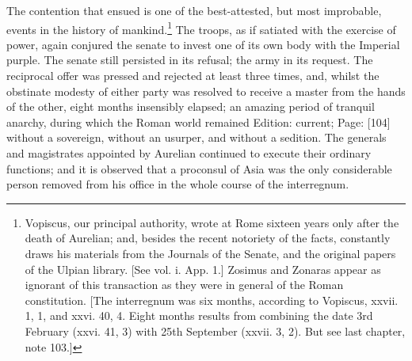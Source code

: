 The contention that ensued is one of the best-attested, but most improbable, events in the history of mankind.\footnote{Vopiscus, our principal authority, wrote at Rome sixteen years only after the death of Aurelian; and, besides the recent notoriety of the facts, constantly draws his materials from the Journals of the Senate, and the original papers of the Ulpian library. [See vol. i. App. 1.] Zosimus and Zonaras appear as ignorant of this transaction as they were in general of the Roman constitution. [The interregnum was six months, according to Vopiscus, xxvii. 1, 1, and xxvi. 40, 4. Eight months results from combining the date 3rd February (xxvi. 41, 3) with 25th September (xxvii. 3, 2). But see last chapter, note 103.]} The troops, as if satiated with the exercise of power, again conjured the senate to invest one of its own body with the Imperial purple. The senate still persisted in its refusal; the army in its request. The reciprocal offer was pressed and rejected at least three times, and, whilst the obstinate modesty of either party was resolved to receive a master from the hands of the other, eight months insensibly elapsed; an amazing period of tranquil anarchy, during which the Roman world remained Edition: current; Page: [104] without a sovereign, without an usurper, and without a sedition. The generals and magistrates appointed by Aurelian continued to execute their ordinary functions; and it is observed that a proconsul of Asia was the only considerable person removed from his office in the whole course of the interregnum.

